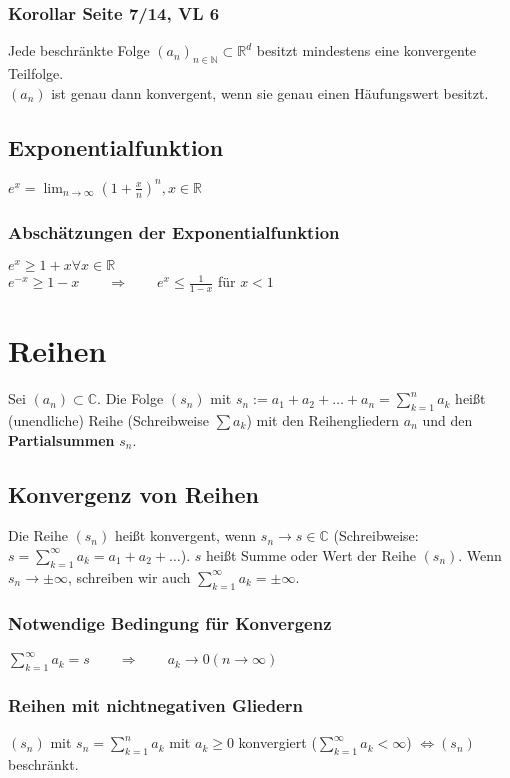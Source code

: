 \documentclass[10pt,a4paper^, twocolumn]{article}
\newcommand{\R}{\mathbb{R}}
\newcommand{\N}{\mathbb{N}}
\newcommand{\C}{\mathbb{C}}
\begin{document}
	\subsubsection{Korollar Seite 7/14, VL 6}
		Jede beschränkte Folge $(a_n)_{n \in \N} \subset \R^d$ besitzt
		mindestens eine konvergente Teilfolge.\\
		$(a_n)$ ist genau dann konvergent, wenn sie genau einen Häufungswert besitzt.	
	\subsection{Exponentialfunktion}
		$e^x = \lim_{n \to \infty} \left(1 + \frac{x}{n} \right)^n, x \in \R$
	\subsubsection{Abschätzungen der Exponentialfunktion}
		$e^x \geq 1 + x \forall x \in \R$\\
		$e^{-x} \geq 1 - x \qquad \Rightarrow \qquad e^x \leq \frac{1}{1-x}$ für $x < 1$ 
		

\section{Reihen}
	Sei $(a_n) \subset \C$. Die Folge $(s_n)$ mit 
	$s_n := a_1 + a_2 + \dots + a_n = \sum\limits_{k=1}^{n} a_k$ heißt (unendliche) Reihe
	(Schreibweise $\sum a_k$) mit den Reihengliedern $a_n$ und den \textbf{Partialsummen}
	$s_n$.
	\subsection{Konvergenz von Reihen}
		Die Reihe $(s_n)$ heißt konvergent, wenn $s_n \to s \in \C$
		(Schreibweise: $s = \sum\limits_{k=1}^{\infty} a_k = a_1 + a_2 + \dots$). 
		$s$ heißt Summe oder Wert der Reihe $(s_n)$.
		Wenn $s_n \to \pm \infty$, schreiben wir auch 
		$\sum\limits_{k=1}^{\infty} a_k = \pm \infty$.\\
		\subsubsection{Notwendige Bedingung für Konvergenz}
			$\sum\limits_{k=1}^{\infty} a_k = s 
			\qquad \Rightarrow \qquad 
			a_k \to 0 (n \to \infty)$
		\subsubsection{Reihen mit nichtnegativen Gliedern}
			$(s_n)$ mit $s_n = \sum\limits_{k=1}^{n} a_k$ mit $a_k \geq 0$ konvergiert 
			($\sum\limits_{k=1}^{\infty} a_k < \infty$) $\Leftrightarrow (s_n) $ beschränkt.
\end{document}

